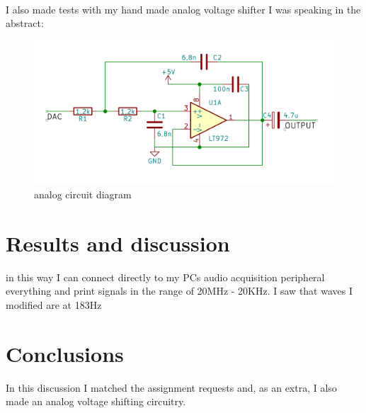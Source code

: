 \documentclass[peerreview]{IEEEtran}
\begin{document}
\\I also made tests with my hand made analog voltage shifter I was speaking in the abstract:
\begin{figure}[!ht]
\centering
\includegraphics[width=0.8\columnwidth]{diagram} 
\caption{analog circuit diagram}
\label{fig_diagram}
\end{figure}
\section{Results and discussion}
\label{tab:template}
in this way I can connect directly to my PCs audio acquisition peripheral everything and print signals in the range of 20MHz - 20KHz. I saw that waves I modified are at 183Hz
\section{Conclusions}
In this discussion I matched the assignment requests and, as an extra, I also made an analog voltage shifting circuitry.
\end{document}
